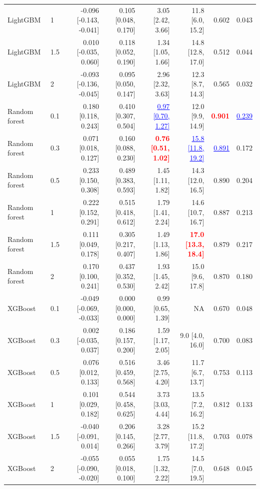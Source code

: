 \begin{table}[!htbp]
\begin{tabular}{llrrrrrr}
LightGBM & 1 & -0.096 [-0.143, -0.041] & 0.105 [0.048, 0.170] & 3.05 [2.42, 3.66] & 11.8 [6.0, 15.2] & 0.602 & 0.043 \\
LightGBM & 1.5 & 0.010 [-0.035, 0.060] & 0.118 [0.052, 0.190] & 1.34 [1.05, 1.66] & 14.8 [12.8, 17.0] & 0.512 & 0.044 \\
LightGBM & 2 & -0.093 [-0.136, -0.045] & 0.095 [0.050, 0.147] & 2.96 [2.32, 3.63] & 12.3 [8.7, 14.3] & 0.565 & 0.032 \\
Random forest & 0.1 & 0.180 [0.118, 0.243] & 0.410 [0.307, 0.504] & \textcolor{blue}{\underline{0.97 [0.70, 1.27]}} & 12.0 [9.9, 14.9] & \textcolor{red}{\textbf{0.901}} & \textcolor{blue}{\underline{0.239}} \\
Random forest & 0.3 & 0.071 [0.018, 0.127] & 0.160 [0.088, 0.230] & \textcolor{red}{\textbf{0.76 [0.51, 1.02]}} & \textcolor{blue}{\underline{15.8 [11.8, 19.2]}} & \textcolor{blue}{\underline{0.891}} & 0.172 \\
Random forest & 0.5 & 0.233 [0.150, 0.308] & 0.489 [0.383, 0.593] & 1.45 [1.11, 1.82] & 14.3 [12.0, 16.5] & 0.890 & 0.204 \\
Random forest & 1 & 0.222 [0.152, 0.291] & 0.515 [0.418, 0.612] & 1.79 [1.41, 2.24] & 14.6 [10.7, 16.7] & 0.887 & 0.213 \\
Random forest & 1.5 & 0.111 [0.049, 0.178] & 0.305 [0.217, 0.407] & 1.49 [1.13, 1.86] & \textcolor{red}{\textbf{17.0 [13.3, 18.4]}} & 0.879 & 0.217 \\
Random forest & 2 & 0.170 [0.100, 0.241] & 0.437 [0.352, 0.530] & 1.93 [1.45, 2.42] & 15.0 [9.6, 17.8] & 0.870 & 0.180 \\
XGBoost & 0.1 & -0.049 [-0.069, -0.033] & 0.000 [0.000, 0.000] & 0.99 [0.65, 1.39] & NA & 0.670 & 0.048 \\
XGBoost & 0.3 & 0.002 [-0.035, 0.037] & 0.186 [0.157, 0.200] & 1.59 [1.17, 2.05] & 9.0 [4.0, 16.0] & 0.700 & 0.083 \\
XGBoost & 0.5 & 0.076 [0.012, 0.133] & 0.516 [0.459, 0.568] & 3.46 [2.75, 4.20] & 11.7 [6.7, 13.7] & 0.753 & 0.113 \\
XGBoost & 1 & 0.101 [0.029, 0.182] & 0.544 [0.458, 0.625] & 3.73 [3.03, 4.44] & 13.5 [7.2, 16.2] & 0.812 & 0.133 \\
XGBoost & 1.5 & -0.040 [-0.091, 0.014] & 0.206 [0.145, 0.266] & 3.28 [2.77, 3.79] & 15.2 [11.8, 17.2] & 0.703 & 0.078 \\
XGBoost & 2 & -0.055 [-0.090, -0.020] & 0.055 [0.018, 0.100] & 1.75 [1.32, 2.22] & 14.5 [7.0, 19.5] & 0.648 & 0.045 \\
\bottomrule
\end{tabular}
\end{table}
